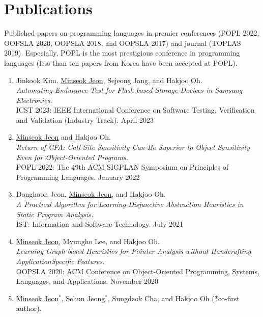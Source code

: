 \documentclass[letterpaper,11pt]{article}
\begin{document}
\section{Publications}
Published papers on programming languages in premier conferences
(POPL 2022, OOPSLA 2020, OOPSLA 2018, and OOPSLA 2017) and
journal (TOPLAS 2019). 
%
Especially, POPL is the most prestigious conference in programming languages (less than ten papers from Korea have been accepted at POPL). 
\begin{enumerate}
  \item {
    Jinkook Kim, \underline{Minseok Jeon}, Sejeong Jang, and Hakjoo Oh.\\
    \textit{Automating Endurance Test for Flash-based Storage Devices in Samsung Electronics.}\\
    ICST 2023: IEEE International Conference on Software Testing, Verification and Validation (Industry Track). April 2023
  }
  \item{
    \underline{Minseok Jeon} and Hakjoo Oh.\\
    \textit{Return of CFA: Call-Site Sensitivity Can Be Superior to Object Sensitivity Even for
    Object-Oriented Programs.}\\
    POPL 2022: The 49th ACM SIGPLAN Symposium on Principles of Programming Languages. January 2022
  }
  \item{
    Donghoon Jeon, \underline{Minseok Jeon}, and Hakjoo Oh.\\
    \textit{A Practical Algorithm for Learning Disjunctive Abstraction Heuristics in Static Program
    Analysis.}\\
    IST: Information and Software Technology. July 2021
  }
  \item{
    \underline{Minseok Jeon}, Myungho Lee, and Hakjoo Oh.\\
    \textit{Learning Graph-based Heuristics for Pointer Analysis without Handcrafting ApplicationSpecific Features.}\\
    OOPSLA 2020: ACM Conference on Object-Oriented Programming, Systems, Languages, and Applications. November 2020
  }
  \item{\underline{Minseok Jeon}$^*$, Sehun Jeong$^*$, Sungdeok Cha, and Hakjoo Oh (*co-first author).\\
}
\end{enumerate}
\end{document}
